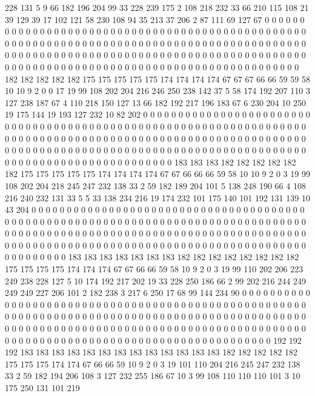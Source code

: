 228 131 5 9 66 182 196 204 99 33 228 239 175 2 108 218 232 33 66 210
115 108 21 39 129 39 17 102 121 58 230 108 94 35 213 37 206 2 87 111
69 127 67 0 0 0 0 0 0 0 0 0 0 0 0 0 0 0 0 0
0 0 0 0 0 0 0 0 0 0 0 0 0 0 0 0 0 0 0 0
0 0 0 0 0 0 0 0 0 0 0 0 0 0 0 0 0 0 0 0
0 0 0 0 0 0 0 0 0 0 0 0 0 0 0 0 0 0 0 0
0 0 0 0 0 0 0 0 0 0 0 0 0 0 0 0 0 0 0 0
0 0 0 0 0 0 0 0 0 0 0 0 0 0 0 0 0 0 0 0
0 0 0 0 0 0 0 0 0 0 0 0 0 0 0 0 0 0 0 0
0 0 0 0 0 0 0 0 0 0 0 0 0 0 0 0 0 0 0 0
0 0 0 0 0 0 0 0 0 0 0 0 0 0 0 0 0 0 0 0
182 182 182 182 182 175 175 175 175 175 174 174 174 174 67 67 67 66 66 59
59 58 10 10 9 2 0 0 17 19 99 108 202 204 216 246 250 238 142 37
5 58 174 192 207 110 3 127 238 187 67 4 110 218 150 127 13 66 182 192
217 196 183 67 6 230 204 10 250 19 175 144 19 193 127 232 10 82 202 0
0 0 0 0 0 0 0 0 0 0 0 0 0 0 0 0 0 0 0 0
0 0 0 0 0 0 0 0 0 0 0 0 0 0 0 0 0 0 0 0
0 0 0 0 0 0 0 0 0 0 0 0 0 0 0 0 0 0 0 0
0 0 0 0 0 0 0 0 0 0 0 0 0 0 0 0 0 0 0 0
0 0 0 0 0 0 0 0 0 0 0 0 0 0 0 0 0 0 0 0
0 0 0 0 0 0 0 0 0 0 0 0 0 0 0 0 0 0 0 0
0 0 0 0 0 0 0 0 0 0 0 0 0 0 0 0 0 0 0 0
0 0 0 0 0 0 0 0 0 0 0 0 0 0 0 0 0 0 0 0
0 0 0 0 0 0 0 0 0 0 0 0 0 0 0 0 183 183 183 182
182 182 182 182 182 175 175 175 175 175 174 174 174 174 67 67 66 66 66 59
58 10 10 9 2 0 3 19 99 108 202 204 218 245 247 232 138 33 2 59
182 189 204 101 5 138 248 190 66 4 108 216 240 232 131 33 5 5 33 138
234 216 19 174 232 101 175 140 101 192 131 139 10 43 204 0 0 0 0 0
0 0 0 0 0 0 0 0 0 0 0 0 0 0 0 0 0 0 0 0
0 0 0 0 0 0 0 0 0 0 0 0 0 0 0 0 0 0 0 0
0 0 0 0 0 0 0 0 0 0 0 0 0 0 0 0 0 0 0 0
0 0 0 0 0 0 0 0 0 0 0 0 0 0 0 0 0 0 0 0
0 0 0 0 0 0 0 0 0 0 0 0 0 0 0 0 0 0 0 0
0 0 0 0 0 0 0 0 0 0 0 0 0 0 0 0 0 0 0 0
0 0 0 0 0 0 0 0 0 0 0 0 0 0 0 0 0 0 0 0
0 0 0 0 0 0 0 0 0 0 0 0 0 0 0 0 0 0 0 0
0 0 0 0 0 0 0 0 0 0 0 0 183 183 183 183 183 183 183 182
182 182 182 182 182 182 182 175 175 175 175 174 174 174 67 67 66 66 59 58
10 9 2 0 3 19 99 110 202 206 223 249 238 228 127 5 10 174 192 217
202 19 33 228 250 186 66 2 99 202 216 244 249 249 249 227 206 101 2 182
238 3 217 6 250 17 68 99 144 234 90 0 0 0 0 0 0 0 0 0
0 0 0 0 0 0 0 0 0 0 0 0 0 0 0 0 0 0 0 0
0 0 0 0 0 0 0 0 0 0 0 0 0 0 0 0 0 0 0 0
0 0 0 0 0 0 0 0 0 0 0 0 0 0 0 0 0 0 0 0
0 0 0 0 0 0 0 0 0 0 0 0 0 0 0 0 0 0 0 0
0 0 0 0 0 0 0 0 0 0 0 0 0 0 0 0 0 0 0 0
0 0 0 0 0 0 0 0 0 0 0 0 0 0 0 0 0 0 0 0
0 0 0 0 0 0 0 0 0 0 0 0 0 0 0 0 0 0 0 0
0 0 0 0 0 0 0 0 0 0 0 0 0 0 0 0 0 0 0 0
0 0 0 0 0 0 0 0 192 192 192 183 183 183 183 183 183 183 183 183
183 183 183 183 182 182 182 182 182 175 175 175 174 174 67 66 66 59 10 9
2 0 3 19 101 110 204 216 245 247 232 138 33 2 59 182 194 206 108 3
127 232 255 186 67 10 3 99 108 110 110 110 101 3 10 175 250 131 101 219
